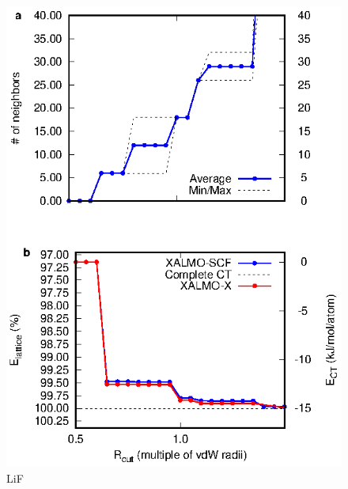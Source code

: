 \documentclass[aps,prb,twocolumn,amsmath,amssymb,superscriptaddress,longbibliography]{revtex4-1}
\begin{document}
\begin{figure}
\includegraphics[scale=1]{./plots/LiF_EvR}
\caption{LiF}
\label{lif}
\end{figure}
\end{document}
